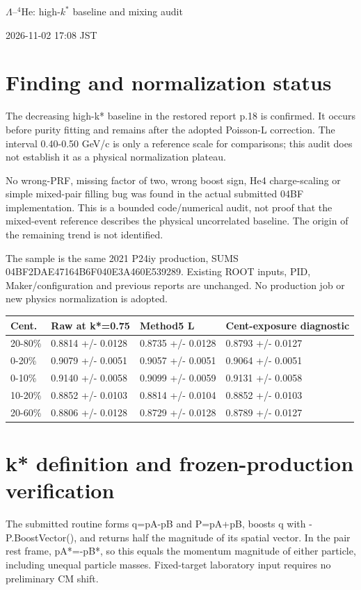 \documentclass[10pt,a4paper]{article}
\begin{document}
\begin{center}{\Large $\Lambda$--$^4$He: high-$k^*$ baseline and mixing audit}\end{center}
2026-11-02 17:08 JST

\section*{Finding and normalization status}
The decreasing high-k* baseline in the restored report p.18 is confirmed. It occurs before purity fitting and remains after the adopted Poisson-L correction. The interval 0.40-0.50 GeV/c is only a reference scale for comparisons; this audit does not establish it as a physical normalization plateau.

No wrong-PRF, missing factor of two, wrong boost sign, He4 charge-scaling or simple mixed-pair filling bug was found in the actual submitted 04BF implementation. This is a bounded code/numerical audit, not proof that the mixed-event reference describes the physical uncorrelated baseline. The origin of the remaining trend is not identified.

The sample is the same 2021 P24iy production, SUMS 04BF2DAE47164B6F040E3A460E539289. Existing ROOT inputs, PID, Maker/configuration and previous reports are unchanged. No production job or new physics normalization is adopted.

{\small\setlength{\tabcolsep}{3pt}\begin{longtable}{llll}\toprule
Cent. & Raw at k*=0.75 & Method5 L & Cent-exposure diagnostic\\\midrule\endhead
20-80\% & 0.8814 +/- 0.0128 & 0.8735 +/- 0.0128 & 0.8793 +/- 0.0127\\
0-20\% & 0.9079 +/- 0.0051 & 0.9057 +/- 0.0051 & 0.9064 +/- 0.0051\\
0-10\% & 0.9140 +/- 0.0058 & 0.9099 +/- 0.0059 & 0.9131 +/- 0.0058\\
10-20\% & 0.8852 +/- 0.0103 & 0.8814 +/- 0.0104 & 0.8852 +/- 0.0103\\
20-60\% & 0.8806 +/- 0.0128 & 0.8729 +/- 0.0128 & 0.8789 +/- 0.0127\\
\bottomrule\end{longtable}}
\clearpage
\section*{k* definition and frozen-production verification}
The submitted routine forms q=pA-pB and P=pA+pB, boosts q with -P.BoostVector(), and returns half the magnitude of its spatial vector. In the pair rest frame, pA*=-pB*, so this equals the momentum magnitude of either particle, including unequal particle masses. Fixed-target laboratory input requires no preliminary CM shift.
\end{document}
